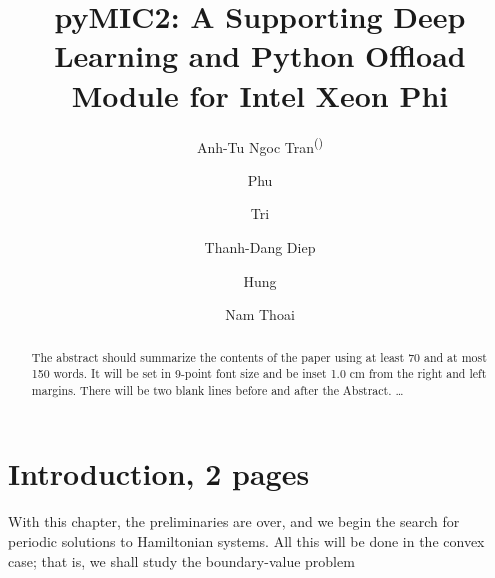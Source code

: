 \documentclass{llncs}
\begin{document}
%
\frontmatter          %
%
\pagestyle{headings}  %
%
\title{pyMIC2: A Supporting Deep Learning and Python Offload Module for Intel Xeon Phi}
%
%
\author{Anh-Tu Ngoc Tran\textsuperscript{(\Letter)} \and
Phu  \and
Tri \and
Thanh-Dang Diep  \and
Hung \and
Nam Thoai
}
%
%
%

\maketitle              %

\begin{abstract}
The abstract should summarize the contents of the paper
using at least 70 and at most 150 words. It will be set in 9-point
font size and be inset 1.0 cm from the right and left margins.
There will be two blank lines before and after the Abstract. \dots


\end{abstract}
%
\section{Introduction, 2 pages}
%
With this chapter, the preliminaries are over, and we begin the search
for periodic solutions to Hamiltonian systems. All this will be done in
the convex case; that is, we shall study the boundary-value problem

\end{document}
